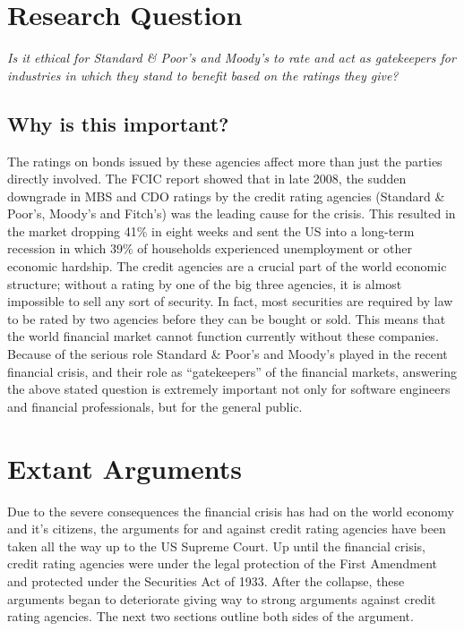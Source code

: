 \documentclass[11pt]{article}
\begin{document}
\begin{multicols}{2}

\section{Research Question}

\textit{Is it ethical for Standard \& Poor's and Moody's to rate and act as gatekeepers for industries in which they stand to benefit based on the ratings they give?}
\newline

\subsection{Why is this important?}

The ratings on bonds issued by these agencies affect more than just the parties directly involved. The FCIC report showed that in late 2008, the sudden downgrade in MBS and CDO ratings by the credit rating agencies (Standard \& Poor's, Moody's and Fitch's) was the leading cause for the crisis. \cite{huffCreditCause, govtReport}  This resulted in the market dropping 41\% in eight weeks \cite{marketWatch} and sent the US into a long-term recession in which 39\% of households experienced unemployment or other economic hardship. \cite{collapseImpact}  The credit agencies are a crucial part of the world economic structure; without a rating by one of the big three agencies, it is almost impossible to sell any sort of security.  In fact, most securities are required by law to be rated by two agencies before they can be bought or sold. \cite{wpMoodies}  This means that the world financial market cannot function currently without these companies.  Because of the serious role Standard \& Poor's and Moody's played in the recent financial crisis, and their role as ``gatekeepers'' of the financial markets, answering the above stated question is extremely important not only for software engineers and financial professionals, but for the general public.    


\section{Extant Arguments}

Due to the severe consequences the financial crisis has had on the world economy and it's citizens, the arguments for and against credit rating agencies have been taken all the way up to the US Supreme Court.  Up until the financial crisis, credit rating agencies were under the legal protection of the First Amendment and protected under the Securities Act of 1933.  After the collapse, these arguments began to deteriorate giving way to strong arguments against credit rating agencies.  The next two sections outline both sides of the argument.
\newline
\newline


\end{multicols}
\end{document}
